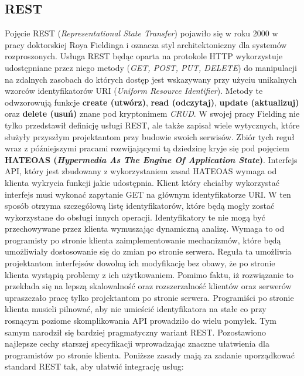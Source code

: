 \subsection{REST}
Pojęcie REST (\textit{Representational State Transfer}) pojawiło się w roku 2000 w pracy doktorskiej Roya Fieldinga\cite{thomas2000architectural} i oznacza styl architektoniczny dla systemów rozproszonych. Usługa REST będąc oparta na protokole HTTP wykorzystuje udostępniane przez niego metody (\textit{GET, POST, PUT, DELETE}) do manipulacji na zdalnych zasobach do których dostęp jest wskazywany przy użyciu unikalnych wzorców identyfikatorów URI (\textit{Uniform Resource Identifier}). Metody te odwzorowują funkcje \textbf{create (utwórz)}, \textbf{read (odczytaj)}, \textbf{update (aktualizuj)} oraz \textbf{delete (usuń)} znane pod kryptonimem \textit{CRUD}.\@
W swojej pracy Fielding nie tylko przedstawił definicję usługi REST, ale także zapisał wiele wytycznych, które służyły przyszłym projektantom przy budowie swoich serwisów. Zbiór tych reguł wraz z późniejszymi pracami rozwijającymi tą dziedzinę kryje się pod pojęciem \textbf{HATEOAS (\textit{Hypermedia As The Engine Of Application State})}. Interfejs API, który jest zbudowany z wykorzystaniem zasad HATEOAS wymaga od klienta wykrycia funkcji jakie udostępnia. Klient który chciałby wykorzystać interfejs musi wykonać zapytanie GET na głównym identyfikatorze URI. W ten sposób otrzyma szczegółową listę identyfikatorów, które będą mogły zostać wykorzystane do obsługi innych operacji. Identyfikatory te nie mogą być przechowywane przez klienta wymuszając dynamiczną analizę. Wymaga to od programisty po stronie klienta zaimplementowanie mechanizmów, które będą umożliwiały dostosowanie się do zmian po stronie serwera. Reguła ta umożliwia projektantom interfejsów dowolną ich modyfikację bez obawy, że po stronie klienta wystąpią problemy z ich użytkowaniem. Pomimo faktu, iż rozwiązanie to przekłada się na lepszą skalowalność oraz rozszerzalność klientów oraz serwerów upraszczało pracę tylko projektantom po stronie serwera. Programiści po stronie klienta musieli pilnować, aby nie umieścić identyfikatora na stałe co przy rosnącym poziome skomplikowania API prowadziło do wielu pomyłek. Tym samym narodził się bardziej pragmatyczny wariant REST. Pozostawiono najlepsze cechy starszej specyfikacji wprowadzając znaczne ułatwienia dla programistów po stronie klienta.
Poniższe zasady mają za zadanie uporządkować standard REST tak, aby ułatwić integrację usług\cite{jacobson2015interfejspragmaticrest}:
